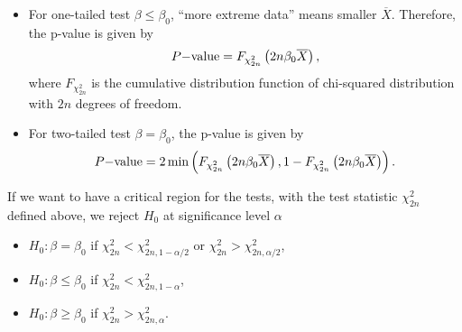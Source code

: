 \begin{itemize}
	\item For one-tailed test $\beta\leq \beta_0$, ``more extreme data'' means smaller $\overline{X}$. Therefore, the p-value is given by
	\begin{align*}
	P\mathrm{-value} = F_{\chi_{2n}^2}\left(2n\beta_0\overline{X} \right),
	\end{align*}
	where $F_{\chi_{2n}^2}$ is the cumulative distribution function of chi-squared distribution with $2n$ degrees of freedom.
	\item For two-tailed test $\beta = \beta_0$, the p-value is given by
	\begin{align*}
	P\mathrm{-value} = 2\min\left(F_{\chi_{2n}^2}\left(2n\beta_0\overline{X} \right), 1-F_{\chi_{2n}^2}\left(2n\beta_0\overline{X} \right) \right).
	\end{align*}
\end{itemize}
If we want to have a critical region for the tests, with the test statistic $\chi_{2n}^2$ defined above, we reject $H_0$ at significance level $\alpha$
\begin{itemize}
	\item $H_0: \beta = \beta_0$ if $\chi_{2n}^2 < \chi_{2n, 1-\alpha/2}^2$ or $\chi_{2n}^2 > \chi_{2n, \alpha/2}^2$,
	\item $H_0: \beta \leq \beta_0$ if $\chi_{2n}^2 < \chi_{2n, 1-\alpha}^2$,
	\item $H_0: \beta \geq \beta_0$ if $\chi_{2n}^2 > \chi_{2n, \alpha}^2$.
\end{itemize}




